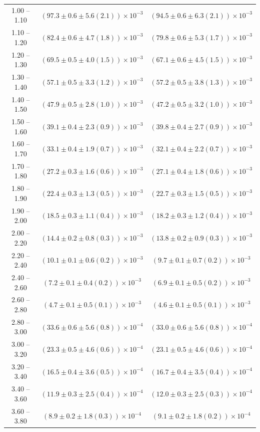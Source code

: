 \begin{table}
\begin{center}
\begin{tabular}{ c | c c }
1.00 -- 1.10 & $(97.3\pm0.6\pm5.6(2.1))\times10^{-3}$ & $(94.5\pm0.6\pm6.3(2.1))\times10^{-3}$ \\ 
1.10 -- 1.20 & $(82.4\pm0.6\pm4.7(1.8))\times10^{-3}$ & $(79.8\pm0.6\pm5.3(1.7))\times10^{-3}$ \\ 
1.20 -- 1.30 & $(69.5\pm0.5\pm4.0(1.5))\times10^{-3}$ & $(67.1\pm0.6\pm4.5(1.5))\times10^{-3}$ \\ 
1.30 -- 1.40 & $(57.1\pm0.5\pm3.3(1.2))\times10^{-3}$ & $(57.2\pm0.5\pm3.8(1.3))\times10^{-3}$ \\ 
1.40 -- 1.50 & $(47.9\pm0.5\pm2.8(1.0))\times10^{-3}$ & $(47.2\pm0.5\pm3.2(1.0))\times10^{-3}$ \\ 
1.50 -- 1.60 & $(39.1\pm0.4\pm2.3(0.9))\times10^{-3}$ & $(39.8\pm0.4\pm2.7(0.9))\times10^{-3}$ \\ 
1.60 -- 1.70 & $(33.1\pm0.4\pm1.9(0.7))\times10^{-3}$ & $(32.1\pm0.4\pm2.2(0.7))\times10^{-3}$ \\ 
1.70 -- 1.80 & $(27.2\pm0.3\pm1.6(0.6))\times10^{-3}$ & $(27.1\pm0.4\pm1.8(0.6))\times10^{-3}$ \\ 
1.80 -- 1.90 & $(22.4\pm0.3\pm1.3(0.5))\times10^{-3}$ & $(22.7\pm0.3\pm1.5(0.5))\times10^{-3}$ \\ 
1.90 -- 2.00 & $(18.5\pm0.3\pm1.1(0.4))\times10^{-3}$ & $(18.2\pm0.3\pm1.2(0.4))\times10^{-3}$ \\ 
2.00 -- 2.20 & $(14.4\pm0.2\pm0.8(0.3))\times10^{-3}$ & $(13.8\pm0.2\pm0.9(0.3))\times10^{-3}$ \\ 
2.20 -- 2.40 & $(10.1\pm0.1\pm0.6(0.2))\times10^{-3}$ & $(9.7\pm0.1\pm0.7(0.2))\times10^{-3}$ \\ 
2.40 -- 2.60 & $(7.2\pm0.1\pm0.4(0.2))\times10^{-3}$ & $(6.9\pm0.1\pm0.5(0.2))\times10^{-3}$ \\ 
2.60 -- 2.80 & $(4.7\pm0.1\pm0.5(0.1))\times10^{-3}$ & $(4.6\pm0.1\pm0.5(0.1))\times10^{-3}$ \\ 
2.80 -- 3.00 & $(33.6\pm0.6\pm5.6(0.8))\times10^{-4}$ & $(33.0\pm0.6\pm5.6(0.8))\times10^{-4}$ \\ 
3.00 -- 3.20 & $(23.3\pm0.5\pm4.6(0.6))\times10^{-4}$ & $(23.1\pm0.5\pm4.6(0.6))\times10^{-4}$ \\ 
3.20 -- 3.40 & $(16.5\pm0.4\pm3.6(0.5))\times10^{-4}$ & $(16.7\pm0.4\pm3.5(0.4))\times10^{-4}$ \\ 
3.40 -- 3.60 & $(11.9\pm0.3\pm2.5(0.4))\times10^{-4}$ & $(12.0\pm0.3\pm2.5(0.3))\times10^{-4}$ \\ 
3.60 -- 3.80 & $(8.9\pm0.2\pm1.8(0.3))\times10^{-4}$ & $(9.1\pm0.2\pm1.8(0.2))\times10^{-4}$ \\ 

\end{tabular}
\end{center}
\end{table}
